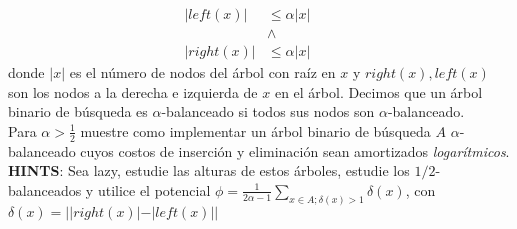 \documentclass[dcc,uchile]{fcfmcourse}
\theoremstyle{plain}
\theoremstyle{definition}
\begin{document}
\begin{problems}
\begin{align*}
    |left(x)| &\le \alpha |x|\quad\\
    & \land\\
    |right(x)| &\le \alpha |x|&
\end{align*}
donde $|x|$ es el número de nodos del árbol con raíz en $x$ y $right(x), left(x)$ son los nodos a la derecha e izquierda de $x$ en el árbol. Decimos que un árbol binario de búsqueda es $\alpha$-balanceado si todos sus nodos son $\alpha$-balanceado.\\
Para $\alpha>\frac{1}{2}$ muestre como implementar un árbol binario de búsqueda $A$ $\alpha$-balanceado cuyos costos de inserción y eliminación sean amortizados \textit{logarítmicos}.\\

\textbf{HINTS}: Sea lazy, estudie las alturas de estos árboles, estudie los $1/2$-balanceados y utilice el potencial $\phi = \frac{1}{2\alpha-1}\sum_{x\in A; \delta(x) > 1} \delta(x)$, con $\delta(x) = ||right(x)|-|left(x)||$
\end{problems}
\end{document}

